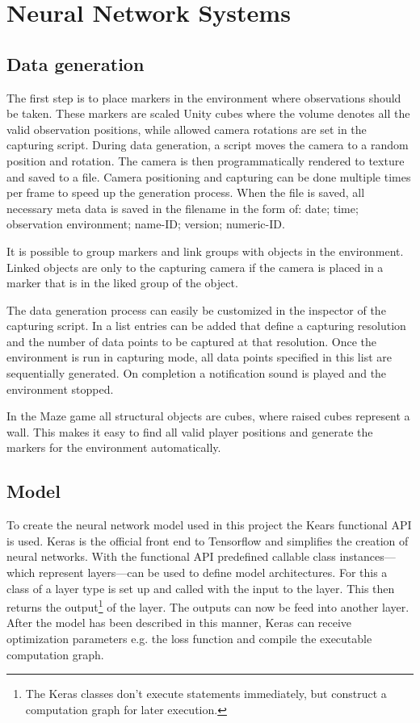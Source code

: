 
\chapter{Neural Network Systems}
\section{Data generation}
The first step is to place markers in the environment where observations should be taken. These markers are scaled Unity cubes where the volume denotes all the valid observation positions, while allowed camera rotations are set in the capturing script. During data generation, a script moves the camera to a random position and rotation. The camera is then programmatically rendered to texture and saved to a file. Camera positioning and capturing can be done multiple times per frame to speed up the generation process. When the file is saved, all necessary meta data is saved in the filename in the form of: date; time; observation environment; name-ID; version; numeric-ID.

It is possible to group markers and link groups with objects in the environment. Linked objects are only to the capturing camera if the camera is placed in a marker that is in the liked group of the object.

The data generation process can easily be customized in the inspector of the capturing script. In a list entries can be added that define a capturing resolution and the number of data points to be captured at that resolution. Once the environment is run in capturing mode, all data points specified in this list are sequentially generated. On completion a notification sound is played and the environment stopped.

In the Maze game all structural objects are cubes, where raised cubes represent a wall. This makes it easy to find all valid player positions and generate the markers for the environment automatically.



\section{Model}
To create the neural network model used in this project the Kears functional API is used. Keras is the official front end to Tensorflow and simplifies the creation of neural networks. With the functional API predefined callable class instances---which represent layers---can be used to define model architectures. For this a class of a layer type is set up and called with the input to the layer. This then returns the output\footnote{The Keras classes don't execute statements immediately, but construct a computation graph for later execution.} of the layer. The outputs can now be feed into another layer. After the model has been described in this manner, Keras can receive optimization parameters e.g. the loss function and compile the executable computation graph.

